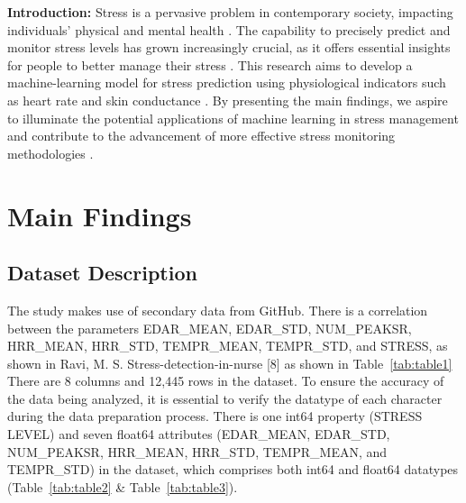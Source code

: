 \documentclass{article}
\begin{document}
\textbf{Introduction:} Stress is a pervasive problem in contemporary society, impacting individuals' physical and mental health \cite{cohen2007}. The capability to precisely predict and monitor stress levels has grown increasingly crucial, as it offers essential insights for people to better manage their stress \cite{sharma2012}. This research aims to develop a machine-learning model for stress prediction using physiological indicators such as heart rate and skin conductance \cite{healey2005}. By presenting the main findings, we aspire to illuminate the potential applications of machine learning in stress management \cite{calvo2010} and contribute to the advancement of more effective stress monitoring methodologies \cite{sano2013}.





\section{Main Findings}

\subsection{Dataset Description}
The study makes use of secondary data from GitHub. There is a correlation between the parameters EDAR\_MEAN, EDAR\_STD, NUM\_PEAKSR, HRR\_MEAN, HRR\_STD, TEMPR\_MEAN, TEMPR\_STD, and STRESS, as shown in Ravi, M. S. Stress-detection-in-nurse [8] as shown in Table~\ref{tab:table1} There are 8 columns and 12,445 rows in the dataset. To ensure the accuracy of the data being analyzed, it is essential to verify the datatype of each character during the data preparation process. There is one int64 property (STRESS LEVEL) and seven float64 attributes (EDAR\_MEAN, EDAR\_STD, NUM\_PEAKSR, HRR\_MEAN, HRR\_STD, TEMPR\_MEAN, and TEMPR\_STD) in the dataset, which comprises both int64 and float64 datatypes (Table~\ref{tab:table2} \& Table~\ref{tab:table3}).
\vspace{0.01cm}
\end{document}
